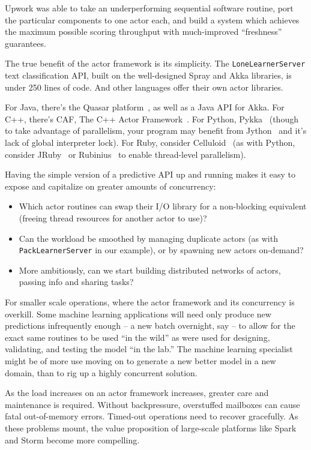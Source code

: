 \documentclass[tablecaption=bottom,wcp]{jmlr}
\begin{document}
Upwork was able to take an underperforming sequential software routine, port the
particular components to one actor each, and build a system which achieves the
maximum possible scoring throughput with much-improved ``freshness'' guarantees.

The true benefit of the actor framework is its simplicity. The \texttt{LoneLearnerServer}
text classification API, built on the well-designed Spray and Akka libraries, is under 
250 lines of code. And other languages offer their own actor libraries.

For Java, there's the Quasar platform~\cite{quasar_doc}, as well as a Java API for
Akka. For C++, there's CAF, The C++ Actor Framework~\cite{charousset2014caf}.
For Python, Pykka~\cite{pykka_doc} (though to take advantage of parallelism,
your program may benefit from Jython~\cite{jython} and it's lack of global interpreter
lock). For Ruby, consider Celluloid~\cite{celluloid_doc} (as with Python, consider 
JRuby~\cite{jruby_doc} or Rubinius~\cite{rubinius_doc} to enable thread-level
parallelism).


Having the simple version of a predictive API up and running
makes it easy to expose and capitalize on greater amounts of concurrency:
\begin{itemize}
\item Which actor routines can swap their I/O library for a non-blocking equivalent
(freeing thread resources for another actor to use)? 
\item Can the workload be smoothed by managing duplicate actors (as with
 \texttt{PackLearnerServer} in our example), or by spawning new actors 
 on-demand? 
\item More ambitiously, can we start building distributed networks of actors, passing 
info and sharing tasks?
\end{itemize}

For smaller scale operations, where the actor framework and its concurrency 
is overkill. Some machine learning applications will need only produce 
new predictions infrequently enough -- a new batch overnight, say -- to allow
for the exact
same routines to be used ``in the wild'' as were used for designing, validating,
and testing the model ``in the lab.'' The machine learning specialist might be
of more use moving on to generate a new better model in a new domain, than 
to rig up a highly concurrent solution.

As the load increases on an actor framework increases, greater care and
maintenance is required. Without backpressure, overstuffed mailboxes can
cause fatal out-of-memory errors. Timed-out operations need to recover gracefully.
As these problems mount, the value proposition of large-scale platforms like
Spark and Storm become more compelling.
\end{document}
